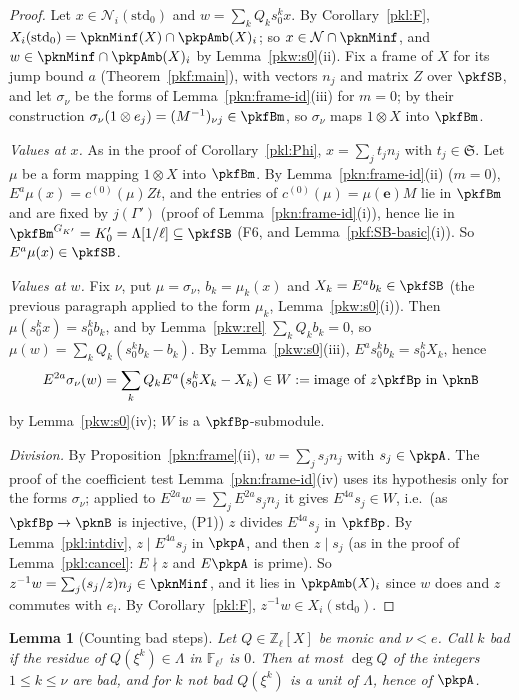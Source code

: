 \documentclass[10pt]{amsart}
\newtheorem{lemma}[theorem]{Lemma}
\theoremstyle{definition}
\theoremstyle{remark}
\newcommand{\Z}{\mathbb Z}
\begin{document}
\begin{proof}
Let $x\in\mathcal N_i(\mathrm{std}_0)$ and $w=\sum_kQ_ks_0^kx$. By Corollary~\ref{pkl:F}, $X_i(\mathrm{std}_0)=
\pknMinf(X)\cap\pkpAmb(X)_i$; so $x\in\mathcal N\cap\pknMinf$, and $w\in\pknMinf\cap\pkpAmb(X)_i$ by
Lemma~\ref{pkw:s0}(ii). Fix a frame of $X$ for its jump bound $a$ (Theorem~\ref{pkf:main}), with vectors $n_j$ and
matrix $Z$ over $\pkfSB$, and let $\sigma_\nu$ be the forms of Lemma~\ref{pkn:frame-id}(iii) for $m=0$; by their
construction $\sigma_\nu(1\otimes e_j)=(M^{-1})_{\nu j}\in\pkfBm$, so $\sigma_\nu$ maps $1\otimes X$ into $\pkfBm$.

\emph{Values at $x$.} As in the proof of Corollary~\ref{pkl:Phi}, $x=\sum_jt_jn_j$ with $t_j\in\mathfrak S$. Let $\mu$ be a
form mapping $1\otimes X$ into $\pkfBm$. By Lemma~\ref{pkn:frame-id}(ii) ($m=0$), $E^a\mu(x)=c^{(0)}(\mu)Zt$, and the
entries of $c^{(0)}(\mu)=\mu(\mathbf e)M$ lie in $\pkfBm$ and are fixed by $j(\Gamma')$ (proof of
Lemma~\ref{pkn:frame-id}(i)), hence lie in $\pkfBm^{G_{K'}}=K'_0=\Lambda[1/\ell]\subseteq\pkfSB$ (F6, and
Lemma~\ref{pkf:SB-basic}(i)). So $E^a\mu(x)\in\pkfSB$.

\emph{Values at $w$.} Fix $\nu$, put $\mu=\sigma_\nu$, $b_k=\mu_k(x)$ and $X_k=E^ab_k\in\pkfSB$ (the previous paragraph
applied to the form $\mu_k$, Lemma~\ref{pkw:s0}(i)). Then $\mu(s_0^kx)=s_0^kb_k$, and by Lemma~\ref{pkw:rel}
$\sum_kQ_kb_k=0$, so $\mu(w)=\sum_kQ_k(s_0^kb_k-b_k)$. By Lemma~\ref{pkw:s0}(iii), $E^a s_0^kb_k=s_0^kX_k$, hence
\[
E^{2a}\sigma_\nu(w)=\sum_kQ_kE^a\bigl(s_0^kX_k-X_k\bigr)\in W:=\text{image of }z\pkfBp\text{ in }\pknB
\]
by Lemma~\ref{pkw:s0}(iv); $W$ is a $\pkfBp$-submodule.

\emph{Division.} By Proposition~\ref{pkn:frame}(ii), $w=\sum_js_jn_j$ with $s_j\in\pkpA$. The proof of the coefficient test
Lemma~\ref{pkn:frame-id}(iv) uses its hypothesis only for the forms $\sigma_\nu$; applied to $E^{2a}w=\sum_jE^{2a}s_jn_j$ it
gives $E^{4a}s_j\in W$, i.e.\ (as $\pkfBp\to\pknB$ is injective, (P1)) $z$ divides $E^{4a}s_j$ in $\pkfBp$. By
Lemma~\ref{pkl:intdiv}, $z\mid E^{4a}s_j$ in $\pkpA$, and then $z\mid s_j$ (as in the proof of Lemma~\ref{pkl:cancel}:
$E\nmid z$ and $E\pkpA$ is prime). So $z^{-1}w=\sum_j(s_j/z)n_j\in\pknMinf$, and it lies in $\pkpAmb(X)_i$ since $w$ does
and $z$ commutes with $e_i$. By Corollary~\ref{pkl:F}, $z^{-1}w\in X_i(\mathrm{std}_0)$.
\end{proof}

\begin{lemma}[Counting bad steps]\label{pkw:count}
Let $Q\in\Z_\ell[X]$ be monic and $\nu<e$. Call $k$ \emph{bad} if the residue of $Q(\xi^k)\in\Lambda$ in
$\mathbb F_{\ell^f}$ is $0$. Then at most $\deg Q$ of the integers $1\le k\le\nu$ are bad, and for $k$ not bad
$Q(\xi^k)$ is a unit of $\Lambda$, hence of $\pkpA$.
\end{lemma}
\end{document}
